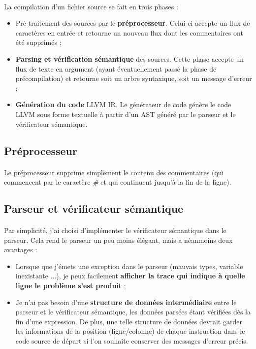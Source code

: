 \documentclass[a4paper]{article}
\begin{document}
    \paragraph{}La compilation d'un fichier source se fait en trois phases :
    \begin{itemize}
        \item Pré-traitement des sources par le \textbf{préprocesseur}.
Celui-ci accepte un flux de caractères en entrée et retourne un nouveau flux
dont les commentaires ont été supprimés ;
        \item \textbf{Parsing et vérification sémantique} des sources.
Cette phase accepte un flux de texte en argument (ayant éventuellement passé
la phase de précompilation) et retourne soit un arbre syntaxique, soit un
message d'erreur ;
        \item \textbf{Génération du code} LLVM IR. Le générateur de code génère
le code LLVM sous forme textuelle à partir d'un AST généré par le parseur et
le vérificateur sémantique.
    \end{itemize}

  \subsection{Préprocesseur}

    \paragraph{}Le préprocesseur supprime simplement le contenu des commentaires
(qui commencent par le caractère \textit{\#} et qui continuent jusqu'à la fin de
la ligne).

  \subsection{Parseur et vérificateur sémantique}

    \paragraph{}Par simplicité, j'ai choisi d'implémenter le vérificateur
sémantique dans le parseur. \newline
Cela rend le parseur un peu moins élégant, mais a néanmoins deux avantages :
    \begin{itemize}
        \item Lorsque que j'émets une exception dans le parseur (mauvais types,
variable inexistante ...), je peux facilement \textbf{afficher la trace qui
indique à quelle ligne le problème s'est produit} ;
        \item Je n'ai pas besoin d'une \textbf{structure de données
intermédiaire} entre le parseur et le vérificateur sémantique, les données
parsées étant vérifiées dès la fin d'une expression.
De plus, une telle structure de données devrait garder les informations de la
position (ligne/colonne) de chaque instruction dans le code source de départ si
l'on souhaite conserver des messages d'erreur précis.
    \end{itemize}
\end{document}
